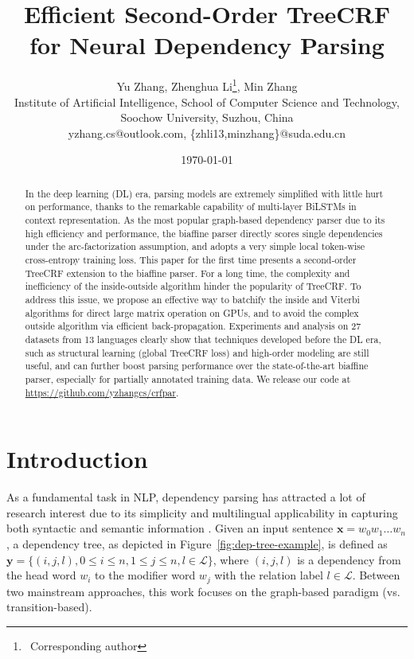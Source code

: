 \documentclass[11pt,a4paper]{article}
\title{Efficient Second-Order TreeCRF for Neural Dependency Parsing}
\author{
    Yu Zhang,
    Zhenghua Li\thanks{$~~$Corresponding author},
    Min Zhang \\
    Institute of Artificial Intelligence, School of Computer Science and Technology, \\
    Soochow University, Suzhou, China \\
    {yzhang.cs@outlook.com, \{zhli13,minzhang\}@suda.edu.cn}
}
\date{\today}
\begin{document}
\maketitle

\begin{abstract}
\label{section:abstract}
In the deep learning (DL) era, parsing models are extremely simplified with little hurt on performance, thanks to the remarkable capability of multi-layer BiLSTMs in context representation.
As the most popular graph-based dependency parser
due to its high efficiency and performance, the biaffine parser directly scores single dependencies under the arc-factorization assumption, and adopts a very simple local token-wise cross-entropy training loss.
This paper for the first time presents a second-order TreeCRF extension to the biaffine parser.
For a long time, the complexity and inefficiency of the inside-outside algorithm hinder the popularity of TreeCRF.
To address this issue, we propose an effective way to batchify the inside and Viterbi algorithms for direct large matrix operation on GPUs, and to avoid the complex outside algorithm via efficient back-propagation.
Experiments and analysis on 27 datasets from 13 languages clearly show that techniques developed before the DL era, such as structural learning (global TreeCRF loss) and high-order modeling are still useful, and can further boost parsing performance over the state-of-the-art biaffine parser, especially for partially annotated training data.
We release our code at \url{https://github.com/yzhangcs/crfpar}.
\end{abstract} \section{Introduction}
\label{section:introduction}

As a fundamental task in NLP, dependency parsing has attracted a lot of research interest due to its simplicity and multilingual applicability in capturing both syntactic and semantic information \cite{nivre-lrec2016-UD1.0}.
Given an input sentence $\boldsymbol{x}=w_0w_1 \ldots w_n$,
a dependency tree, as depicted in Figure~\ref{fig:dep-tree-example}, is defined as $\boldsymbol{y}=\{(i,j,l), 0\le i \le n, 1 \le j \le n, l \in \mathcal{L}\}$,
where $(i,j,l)$ is a dependency from the head word $w_i$ to the modifier word $w_j$ with the relation label $l \in \mathcal{L}$.
Between two mainstream approaches, this work focuses on the graph-based paradigm (vs. transition-based).
\end{document}
